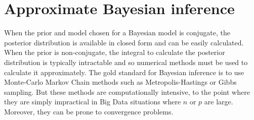 



\section{Approximate Bayesian inference}

When the prior and model chosen for a Bayesian model is conjugate, the posterior
distribution is available in closed form and can be easily calculated.  When the
prior is non-conjugate, the integral to calculate the posterior distribution is
typically intractable and so numerical methods must be used to calculate it
approximately.  The gold standard for Bayesian inference is to use Monte-Carlo
Markov Chain methods such as Metropolis-Hastings or Gibbs sampling. But these
methods are computationally intensive, to the point where they are simply
impractical in Big Data situations where $n$ or $p$ are large. Moreover, they
can be prone to convergence problems.


